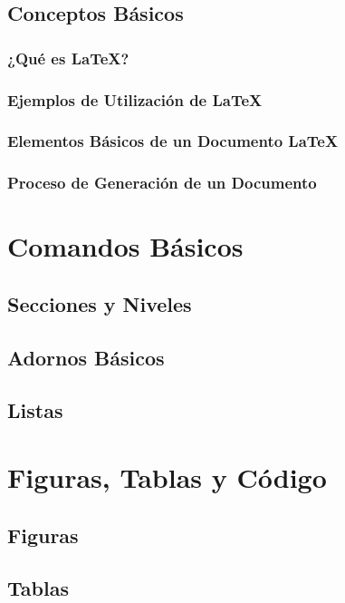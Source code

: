 \documentclass[a4paper,slidestop,xcolor=pst,dvips,blue]{beamer}
\begin{document}
\subsection{Conceptos Básicos}

\begin{frame}
    \frametitle{¿Qué es \LaTeX?}
\end{frame}

\begin{frame}
    \frametitle{Ejemplos de Utilización de \LaTeX}
\end{frame}

\begin{frame}
    \frametitle{Elementos Básicos de un Documento \LaTeX}
\end{frame}

\begin{frame}
    \frametitle{Proceso de Generación de un Documento}
\end{frame}

\section{Comandos Básicos}

\subsection{Secciones y Niveles}

\subsection{Adornos Básicos}

\subsection{Listas}

\section{Figuras, Tablas y Código}

\subsection{Figuras}

\subsection{Tablas}
\end{document}
